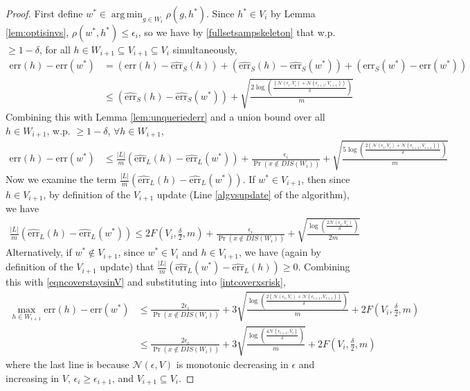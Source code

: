 \documentclass{article}[12pt]
\theoremstyle{named}
\DeclareMathOperator*{\argmin}{arg\,min}
\DeclareMathOperator{\Prtxt}{Pr}
\newcommand{\abs}[1]{\left| #1 \right|}
\newcommand{\prp}[2]{\Prtxt_{#2} \left(#1\right)}
\newcommand{\err}[1]{\mbox{err}\left(#1\right)}
\newcommand{\emperr}[2]{\widehat{\mbox{err}}_{#2} \left(#1\right)}
\newcommand{\cN}{\mathcal{N}}
\newcommand{\lrp}[1]{\left(#1\right)}
\begin{document}
\begin{proof}
First define $ w^* \in \argmin_{g \in W_i} \rho (g, h^*)$. 
Since $h^* \in V_i$ by Lemma \ref{lem:optisinvs}, $\rho(w^*, h^*) \leq \epsilon_i$, so
we have by \eqref{fullsetsampskeleton} that w.p. $\geq 1- \delta$, 
for all $h \in W_{i+1} \subseteq V_{i+1} \subseteq V_i$ simultaneously, 
\begin{align*}
\err{h} - \err{w^*} &= \lrp{\err{h} - \emperr{h}{S}} + \lrp{\emperr{h}{S} - \emperr{w^*}{S}} + \lrp{\emperr{w^*}{S} - \err{w^*}} \\
&\leq \lrp{\emperr{h}{S} - \emperr{w^*}{S}} + \sqrt{\frac{2 \log \lrp{\frac{ \lrp{\cN (\epsilon_i, V_i) + \cN (\epsilon_{i+1}, V_{i+1}) } }{\delta}} }{ m }}
\end{align*}
Combining this with Lemma \ref{lem:unqueriederr} and a union bound over all $h \in W_{i+1}$, 
w.p. $\geq 1- \delta$, $\forall h \in W_{i+1}$, 
\begin{align}
\label{intcoverxsrisk}
\err{h} - \err{w^*} &\leq \frac{\abs{L}}{m} \lrp{ \emperr{h}{L} - \emperr{w^*}{L} } + \frac{\epsilon_i}{\prp{x \notin DIS(W_i)}{}} 
+ \sqrt{\frac{ 5 \log \lrp{\frac{ 2 \lrp{\cN (\epsilon_i, V_i) + \cN (\epsilon_{i+1}, V_{i+1}) } }{\delta}} }{ m }}
\end{align}
Now we examine the term $\frac{\abs{L}}{m} \lrp{ \emperr{h}{L} - \emperr{w^*}{L} }$. 
If $w^* \in V_{i+1}$, 
then since $h \in V_{i+1}$,
by definition of the $V_{i+1}$ update (Line \ref{algvsupdate} of the algorithm), 
we have 
\begin{align}
\label{eqncoverstaysinV}
\frac{\abs{L}}{m} \lrp{ \emperr{h}{L} - \emperr{w^*}{L} } \leq 2 F \lrp{ V_i, \frac{\delta}{2}, m } + \frac{\epsilon_i}{\prp{x \notin DIS(W_i)}{}} 
+ \sqrt{\frac{\log \lrp{\frac{ 2 \cN (\epsilon_i, V_i) }{\delta}} }{2m }}
\end{align}
Alternatively, if $w^* \notin V_{i+1}$, 
since $w^* \in V_i$ and $h \in V_{i+1}$, 
we have (again by definition of the $V_{i+1}$ update) that 
$\frac{\abs{L}}{m} \lrp{ \emperr{w^*}{L} - \emperr{h}{L} } \geq 0$. 
Combining this with \eqref{eqncoverstaysinV} and substituting into \eqref{intcoverxsrisk},
\begin{align}
\label{excessriskcovtocov}
\max_{h \in W_{i+1}} \err{h} - \err{w^*} &\leq \frac{2 \epsilon_i}{\prp{x \notin DIS(W_i)}{}} 
+ 3 \sqrt{\frac{ \log \lrp{\frac{ 2 \lrp{\cN (\epsilon_i, V_i) + \cN (\epsilon_{i+1}, V_{i+1}) } }{\delta}} }{ m }} 
+ 2 F \lrp{ V_i, \frac{\delta}{2}, m } \nonumber \\
&\leq \frac{2 \epsilon_i}{\prp{x \notin DIS(W_i)}{}} 
+ 3 \sqrt{\frac{ \log \lrp{\frac{ 4 \cN (\epsilon_{i+1}, V_i) }{\delta}} }{ m }} 
+ 2 F \lrp{ V_i, \frac{\delta}{2}, m }
\end{align}
where the last line is because $\cN (\epsilon, V)$ is monotonic decreasing in $\epsilon$ and increasing in $V$, 
$\epsilon_i \geq \epsilon_{i+1}$, and $V_{i+1} \subseteq V_i$.


\end{proof}
\end{document}
